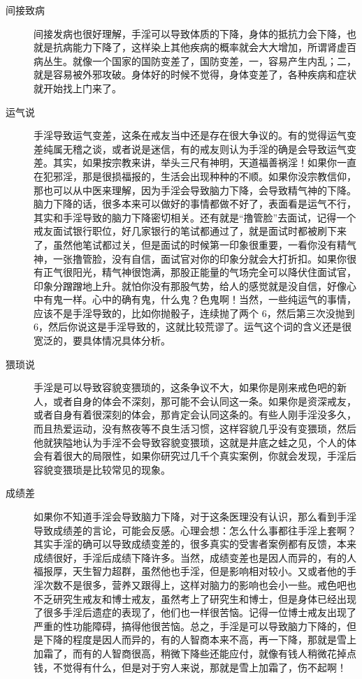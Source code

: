 \documentclass{ctexart}
\begin{document}
\begin{description}
    \item[间接致病] 间接发病也很好理解，手淫可以导致体质的下降，身体的抵抗力会下降，也就是抗病能力下降了，这样染上其他疾病的概率就会大大增加，所谓肾虚百病丛生。就像一个国家的国防变差了，国防变差，一，容易产生内乱；二，就是容易被外邪攻破。身体好的时候不觉得，身体变差了，各种疾病和症状就开始找上门来了。
    \item[运气说] 手淫导致运气变差，这条在戒友当中还是存在很大争议的。有的觉得运气变差纯属无稽之谈，或者说是迷信，有的戒友则认为手淫的确是会导致运气变差。其实，如果按宗教来讲，举头三尺有神明，天道福善祸淫！如果你一直在犯邪淫，那是很损福报的，生活会出现种种的不顺。如果你没宗教信仰，那也可以从中医来理解，因为手淫会导致脑力下降，会导致精气神的下降。脑力下降的话，很多本来可以做好的事情都做不好了，表面看是运气不行，其实和手淫导致的脑力下降密切相关。还有就是“撸管脸”去面试，记得一个戒友面试银行职位，好几家银行的笔试都通过了，就是面试时都被刷下来了，虽然他笔试都过关，但是面试的时候第一印象很重要，一看你没有精气神，一张撸管脸，没有自信，面试官对你的印象分就会大打折扣。如果你很有正气很阳光，精气神很饱满，那股正能量的气场完全可以降伏住面试官，印象分蹭蹭地上升。就怕你没有那股气势，给人的感觉就是没自信，好像心中有鬼一样。心中的确有鬼，什么鬼？色鬼啊！当然，一些纯运气的事情，应该不是手淫导致的，比如你抛骰子，连续抛了两个 6，然后第三次没抛到 6，然后你说这是手淫导致的，这就比较荒谬了。运气这个词的含义还是很宽泛的，要具体情况具体分析。
    \item[猥琐说] 手淫是可以导致容貌变猥琐的，这条争议不大，如果你是刚来戒色吧的新人，或者自身的体会不深刻，那可能不会认同这一条。如果你是资深戒友，或者自身有着很深刻的体会，那肯定会认同这条的。有些人刚手淫没多久，而且热爱运动，没有熬夜等不良生活习惯，这样容貌几乎没有变猥琐，然后他就狭隘地认为手淫不会导致容貌变猥琐，这就是井底之蛙之见，个人的体会有着很大的局限性，如果你研究过几千个真实案例，你就会发现，手淫后容貌变猥琐是比较常见的现象。
    \item[成绩差] 如果你不知道手淫会导致脑力下降，对于这条医理没有认识，那么看到手淫导致成绩差的言论，可能会反感。心理会想：怎么什么事都往手淫上套啊？其实手淫的确可以导致成绩变差的，很多真实的受害者案例都有反馈，本来成绩很好，手淫后成绩下降许多。当然，成绩变差也是因人而异的，有的人福报厚，天生智力超群，虽然他也手淫，但是影响相对较小。又或者他的手淫次数不是很多，营养又跟得上，这样对脑力的影响也会小一些。戒色吧也不乏研究生戒友和博士戒友，虽然考上了研究生和博士，但是身体已经出现了很多手淫后遗症的表现了，他们也一样很苦恼。记得一位博士戒友出现了严重的性功能障碍，搞得他很苦恼。总之，手淫是可以导致脑力下降的，但是下降的程度是因人而异的，有的人智商本来不高，再一下降，那就是雪上加霜了，而有的人智商很高，稍微下降些还能应付，就像有钱人稍微花掉点钱，不觉得有什么，但是对于穷人来说，那就是雪上加霜了，伤不起啊！
\end{description}
\end{document}
